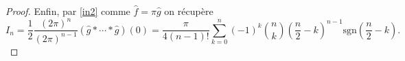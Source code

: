 \documentclass{notes}
\begin{document}
\begin{proof}
Enfin, par \eqref{in2} comme $\hat f = \pi \hat g$ on récupère 
\[ I_n = \frac 12 \frac{(2\pi)^{n}}{(2\pi)^{n-1}} \left( \hat g\ast \cdots \ast \hat  g \right)(0)  =  \frac{\pi}{4(n-1)!}  \sum_{k=0}^{n} (-1)^{k}\binom nk \left( \frac n2 - k \right)^{n-1}\mathrm{sgn}\left( \frac n2 - k \right) .  \]


\end{proof}


 
\end{document}
